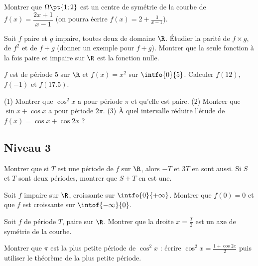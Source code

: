 \begin{exercise}
Montrer que $\Omega\pt{1;2}$ est un centre de symétrie de la courbe de $f(x)=\dfrac{2x+1}{x-1}$ (on pourra écrire $f(x)=2+\frac{3}{x-1}$).
\end{exercise}
\begin{exercise}
Soit $f$ paire et $g$ impaire, toutes deux de domaine $\R$. Étudier la parité de $f\times g$, de $f^2$ et de $f+g$ (donner un exemple pour $f+g$). Montrer que la seule fonction à la fois paire et impaire sur $\R$ est la fonction nulle.
\end{exercise}
\begin{exercise}
$f$ est de période $5$ sur $\R$ et $f(x)=x^2$ sur $\intfo{0}{5}$. Calculer $f(12)$, $f(-1)$ et $f(\num{17,5})$.
\end{exercise}
\begin{exercise}
(1) Montrer que $\cos^2x$ a pour période $\pi$ et qu'elle est paire. (2) Montrer que $\sin x+\cos x$ a pour période $2\pi$. (3) À quel intervalle réduire l'étude de $f(x)=\cos x+\cos2x$ ?
\end{exercise}
\subsection*{Niveau 3}
\begin{exercise}
Montrer que si $T$ est une période de $f$ sur $\R$, alors $-T$ et $3T$ en sont aussi. Si $S$ et $T$ sont deux périodes, montrer que $S+T$ en est une.
\end{exercise}
\begin{exercise}
Soit $f$ impaire sur $\R$, croissante sur $\intfo{0}{+\infty}$. Montrer que $f(0)=0$ et que $f$ est croissante sur $\intof{-\infty}{0}$.
\end{exercise}
\begin{exercise}
Soit $f$ de période $T$, paire sur $\R$. Montrer que la droite $x=\frac T2$ est un axe de symétrie de la courbe.
\end{exercise}
\begin{beyond}
Montrer que $\pi$ est la plus petite période de $\cos^2x$ : écrire $\cos^2x=\frac{1+\cos2x}{2}$ puis utiliser le théorème de la plus petite période.
\end{beyond}

